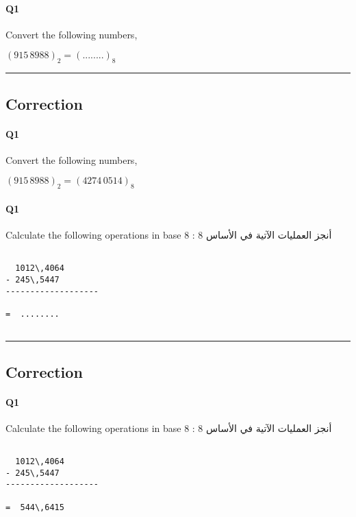 \pagebreak

\paragraph{Q1}

Convert the following numbers, \hfill{}


$(915\,8988)_{ 2 } = (........)_{ 8}$



\hrule width 1\linewidth
\pagebreak

\subsection{Correction}


\paragraph{Q1}

Convert the following numbers, \hfill{}


$(915\,8988)_{ 2 } = (  4274\,0514)_{ 8}$

\pagebreak

\paragraph{Q1}

Calculate  the following operations in base 8 :  أنجز العمليات الآتية في الأساس 8

\begin{verbatim}

  1012\,4064
- 245\,5447
-------------------

=  ........


\end{verbatim}


\hrule width 1\linewidth
\pagebreak

\subsection{Correction}


\paragraph{Q1}

Calculate  the following operations in base 8 :  أنجز العمليات الآتية في الأساس 8

\begin{verbatim}

  1012\,4064
- 245\,5447
-------------------

=  544\,6415


\end{verbatim}
\pagebreak

